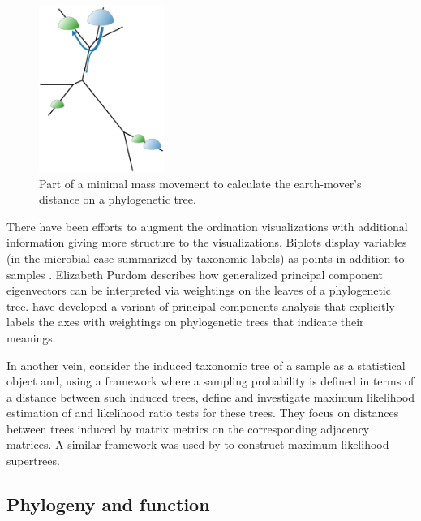 \documentclass{amsart}
\newcommand{\forarxiv}[1]{#1}
\begin{document}
\newcommand{\dirtpilesLegend}{
    Part of a minimal mass movement to calculate the earth-mover's distance on a phylogenetic tree.
}
\forarxiv{
\begin{figure}
  \capstart
  \begin{center}
    \includegraphics[width=1.6in]{figures/tree_dirtpiles.pdf}
  \end{center}
  \vspace{-5pt}
  \caption{\dirtpilesLegend}
  \label{fig:dirtpiles}
\end{figure}
}

There have been efforts to augment the ordination visualizations with additional information giving more structure to the visualizations.
Biplots display variables (in the microbial case summarized by taxonomic labels) as points in addition to samples \citep[e.g.][]{hewitt2013bacterial,lozupone2013meta}.
Elizabeth Purdom \citep{BikEaMicrobiotaStomach06,PurdomAnalyzingDataGraphs08} describes how generalized principal component eigenvectors can be interpreted via weightings on the leaves of a phylogenetic tree.
\citet{matsen2013edge} have developed a variant of principal components analysis that explicitly labels the axes with weightings on phylogenetic trees that indicate their meanings.

In another vein, \citet{la2012statistical} consider the induced taxonomic tree of a sample as a statistical object and, using a framework where a sampling probability is defined in terms of a distance between such induced trees, define and investigate maximum likelihood estimation of and likelihood ratio tests for these trees.
They focus on distances between trees induced by matrix metrics on the corresponding adjacency matrices.
A similar framework was used by \citet{steel2008maximum} to construct maximum likelihood supertrees.


\subsection{Phylogeny and function}
\end{document}
